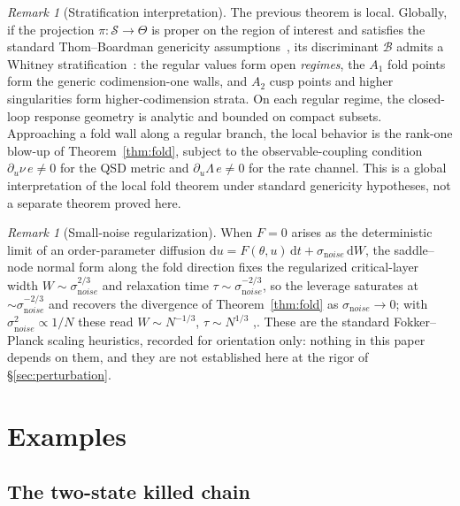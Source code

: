 \documentclass[11pt,reqno]{amsart}
\theoremstyle{plain}
\theoremstyle{definition}
\theoremstyle{remark}
\newtheorem{remark}[theorem]{Remark}
\newcommand{\dd}{\mathrm{d}}
\begin{document}
\begin{remark}[Stratification interpretation]\label{rem:stratification}
The previous theorem is local. Globally, if the projection $\pi\colon\mathcal S\to
\Theta$ is proper on the region of interest and satisfies the standard
Thom--Boardman genericity assumptions~\cite{GolubitskyGuillemin1973}, its
discriminant $\mathcal B$ admits a Whitney
stratification~\cite{Whitney1965,Mather2012}: the regular values form open
\emph{regimes}, the $A_1$ fold points form the generic codimension-one walls, and
$A_2$ cusp points and higher singularities form higher-codimension strata. On each
regular regime, the closed-loop response geometry is analytic and bounded on
compact subsets. Approaching a fold wall along a regular branch, the local behavior
is the rank-one blow-up of Theorem~\ref{thm:fold}, subject to the
observable-coupling condition $\partial_u\nu\,e\neq0$ for the QSD metric and
$\partial_u\Lambda\,e\neq0$ for the rate channel. This is a global interpretation
of the local fold theorem under standard genericity hypotheses, not a separate
theorem proved here.
\end{remark}

\begin{remark}[Small-noise regularization]\label{rem:slowing}
When $F=0$ arises as the deterministic limit of an order-parameter diffusion
$\dd u=F(\theta,u)\,\dd t+\sigma_{\mathrm noise}\,\dd W$, the saddle--node normal
form along the fold direction fixes the regularized critical-layer width
$W\sim\sigma_{\mathrm noise}^{2/3}$ and relaxation time
$\tau\sim\sigma_{\mathrm noise}^{-2/3}$, so the leverage saturates at
$\sim\sigma_{\mathrm noise}^{-2/3}$ and recovers the divergence of
Theorem~\ref{thm:fold} as $\sigma_{\mathrm noise}\to0$; with
$\sigma_{\mathrm noise}^{2}\propto1/N$ these read $W\sim N^{-1/3}$,
$\tau\sim N^{1/3}$ \cite[Ch.~X]{vanKampen2007},\cite{Kuznetsov2004}. These are
the standard Fokker--Planck scaling heuristics, recorded for orientation only:
nothing in this paper depends on them, and they are not established here at the
rigor of \S\ref{sec:perturbation}.
\end{remark}


\section{Examples}\label{sec:examples}


\subsection{The two-state killed chain}\label{sec:two-state}
\end{document}
